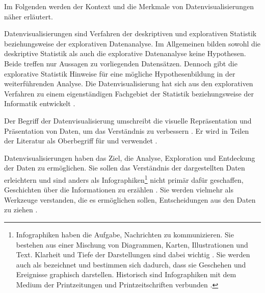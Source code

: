 Im Folgenden werden der Kontext und die Merkmale von Datenvisualisierungen näher erläutert.

Datenvisualisierungen sind Verfahren der deskriptiven und explorativen Statistik beziehungsweise der explorativen Datenanalyse. 
Im Allgemeinen bilden sowohl die deskriptive Statistik als auch die explorative Datenanalyse keine Hypothesen. Beide treffen nur Aussagen zu vorliegenden Datensätzen. 
Dennoch gibt die explorative Statistik Hinweise für eine mögliche Hypothesenbildung in der weiterführenden Analyse. 
Die Datenvisualisierung hat sich aus den explorativen Verfahren zu einem eigenständigen Fachgebiet der Statistik 
beziehungsweise der Informatik entwickelt \cite[vgl.][S. 28 f.]{becker_stochastische_2016}. 



Der Begriff der Datenvisualisierung umschreibt die visuelle Repräsentation und Präsentation von Daten, um das Verständnis zu verbessern \cite[vgl.][S. 15 ff.]{kirk_data_2019}.
Er wird in Teilen der Literatur als Oberbegriff für  und 
 verwendet \cite[vgl.][11]{few_now_2009}.

Datenvisualisierungen haben das Ziel, die Analyse, Exploration und Entdeckung der Daten zu ermöglichen. Sie sollen das Verständnis der dargestellten Daten erleichtern
und sind anders als Infographiken\footnote{ Infographiken haben die Aufgabe, Nachrichten zu kommunizieren.
Sie bestehen aus einer Mischung von Diagrammen, Karten, Illustrationen und Text. Klarheit und Tiefe der Darstellungen sind dabei wichtig
\cite[vgl.][31]{cairo_truthful_2016}. Sie werden auch als 
bezeichnet und bestimmen sich dadurch, dass sie Geschehen und Ereignisse graphisch darstellen. 
Historisch sind Infographiken mit dem Medium der Printzeitungen und Printzeitschriften verbunden \cite[vgl.][27]{kirk_data_2019}.}
nicht primär dafür geschaffen, Geschichten über die Informationen zu erzählen \cite[vgl.][S. 20 ff.]{kirk_data_2019}. 
Sie werden vielmehr als Werkzeuge verstanden, die es ermöglichen sollen, Entscheidungen aus den Daten zu ziehen \cite[vgl.][31]{cairo_truthful_2016}. %

